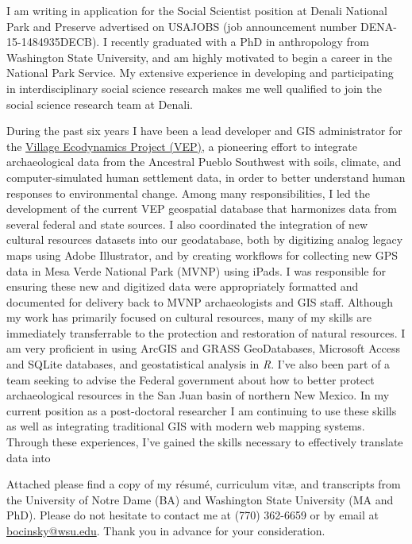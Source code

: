 \documentclass[letterpaper,11pt]{letter}
\begin{document}
\begin{letter}{}
I am writing in application for the Social Scientist position at Denali National Park and Preserve advertised on USAJOBS (job announcement number DENA-15-1484935DECB). I recently graduated with a PhD in anthropology from Washington State University, and am highly motivated to begin a career in the National Park Service. My extensive experience in developing and participating in interdisciplinary social science research makes me well qualified to join the social science research team at Denali.

During the past six years I have been a lead developer and GIS administrator for the \href{http://village.anth.wsu.edu}{Village Ecodynamics Project (VEP)}, a pioneering effort to integrate archaeological data from the Ancestral Pueblo Southwest with soils, climate, and computer-simulated human settlement data, in order to better understand human responses to environmental change. Among many responsibilities, I led the development of the current VEP geospatial database that harmonizes data from several federal and state sources. I also coordinated the integration of new cultural resources datasets into our geodatabase, both by digitizing analog legacy maps using Adobe Illustrator, and by creating workflows for collecting new GPS data in Mesa Verde National Park (MVNP) using iPads. I was responsible for ensuring these new and digitized data were appropriately formatted and documented for delivery back to MVNP archaeologists and GIS staff. Although my work has primarily focused on cultural resources, many of my skills are immediately transferrable to the protection and restoration of natural resources. I am very proficient in using ArcGIS and GRASS GeoDatabases, Microsoft Access and SQLite databases, and geostatistical analysis in \emph{R}. I've also been part of a team seeking to advise the Federal government about how to better protect archaeological resources in the San Juan basin of northern New Mexico. In my current position as a post-doctoral researcher I am continuing to use these skills as well as integrating traditional GIS with modern web mapping systems. Through these experiences, I've gained the skills necessary to effectively translate data into 

Attached please find a copy of my résumé, curriculum vit\ae, and transcripts from the University of Notre Dame (BA) and Washington State University (MA and PhD). Please do not hesitate to contact me at (770) 362-6659 or by email at \href{mailto:bocinsky@wsu.edu}{bocinsky@wsu.edu}. Thank you in advance for your consideration.



\end{letter}
\end{document}

